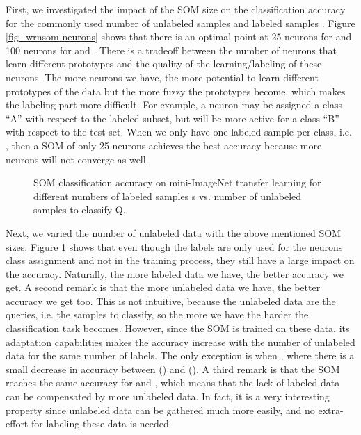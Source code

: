 \documentclass[runningheads]{llncs}
\begin{document}
First, we investigated the impact of the SOM size on the classification accuracy for the commonly used number of unlabeled samples  and labeled samples  \cite{hu2020accurate_few_shot}. Figure \ref{fig_wrnsom-neurons} shows that there is an optimal point at 25 neurons for  and 100 neurons for  and . There is a tradeoff between the number of neurons that learn different prototypes and the quality of the learning/labeling of these neurons. The more neurons we have, the more potential to learn different prototypes of the data but the more fuzzy the prototypes become, which makes the labeling part more difficult. For example, a neuron may be assigned a class ``A'' with respect to the labeled subset, but will be more active for a class ``B'' with respect to the test set. When we only have one labeled sample per class, i.e. , then a SOM of only 25 neurons achieves the best accuracy because more neurons will not converge as well.

\begin{figure}[h!]
	\centerline{}
	\caption{SOM classification accuracy on mini-ImageNet transfer learning for different numbers of labeled samples s vs. number of unlabeled samples to classify Q.}
	\label{fig_wrnsom-data}
\end{figure}

Next, we varied the number of unlabeled data  with the above mentioned SOM sizes. Figure \ref{fig_wrnsom-data} shows that even though the labels are only used for the neurons class assignment and not in the training process, they still have a large impact on the accuracy. Naturally, the more labeled data we have, the better accuracy we get. 
A second remark is that the more unlabeled data we have, the better accuracy we get too. This is not intuitive, because the unlabeled data are the queries, i.e. the samples to classify, so the more we have the harder the classification task becomes. However, since the SOM is trained on these data, its adaptation capabilities makes the accuracy increase with the number of unlabeled data for the same number of labels. The only exception is when , where there is a small decrease in accuracy between  () and  ().
A third remark is that the SOM reaches the same accuracy for  and , which means that the lack of labeled data can be compensated by more unlabeled data. In fact, it is a very interesting property since unlabeled data can be gathered much more easily, and no extra-effort for labeling these data is needed.
\end{document}
